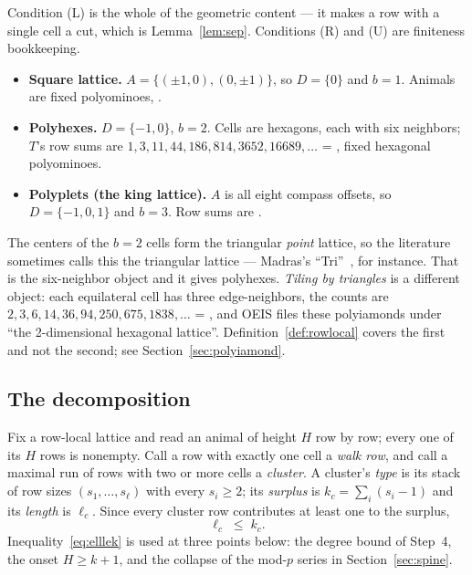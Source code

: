 \documentclass[11pt]{article}
\begin{document}
Condition (L) is the whole of the geometric content --- it makes a row with a
single cell a cut, which is Lemma~\ref{lem:sep}. Conditions (R) and (U) are finiteness bookkeeping.

\begin{example}
\label{ex:instances}
\leavevmode
\begin{itemize}
\item \textbf{Square lattice.} $A = \{(\pm1,0),(0,\pm1)\}$, so $D = \{0\}$ and
  $b=1$. Animals are fixed polyominoes, .
\item \textbf{Polyhexes.} $D = \{-1,0\}$, $b=2$. Cells are hexagons, each with
  six neighbors; $T$'s row sums are $1, 3, 11, 44, 186, 814, 3652, 16689,
  \dots$ = , fixed hexagonal polyominoes.
\item \textbf{Polyplets (the king lattice).} $A$ is all eight compass offsets, so
  $D = \{-1,0,1\}$ and $b=3$. Row sums are .
\end{itemize}
\end{example}

\begin{remark}
\label{rem:names}
The centers of the $b=2$ cells form the triangular \emph{point} lattice, so the
literature sometimes calls this the triangular lattice --- Madras's
``Tri''~\cite{madras1999}, for instance. That is the six-neighbor object and it
gives polyhexes. \emph{Tiling by triangles} is a different object: each
equilateral cell has three edge-neighbors, the counts are
$2, 3, 6, 14, 36, 94, 250, 675, 1838, \dots$ = , and OEIS files
these polyiamonds under ``the 2-dimensional hexagonal lattice''.
Definition~\ref{def:rowlocal} covers the first and not the second; see
Section~\ref{sec:polyiamond}.
\end{remark}

\subsection{The decomposition}

Fix a row-local lattice and read an animal of height $H$ row by row; every one of
its $H$ rows is nonempty. Call a row with exactly one cell a \emph{walk row}, and
call a maximal run of rows with two or more cells a \emph{cluster}. A cluster's
\emph{type} is its stack of row sizes $(s_1,\dots,s_\ell)$ with every
$s_i \ge 2$; its \emph{surplus} is $k_c = \sum_i (s_i - 1)$ and its \emph{length}
is $\ell_c$. Since every cluster row contributes at least one to the surplus,
\begin{equation}
  \ell_c \;\le\; k_c .
  \label{eq:elllek}
\end{equation}
Inequality~\eqref{eq:elllek} is used at three points below: the degree bound of
Step~4, the onset $H \ge k+1$, and the collapse of the mod-$p$ series in
Section~\ref{sec:spine}.
\end{document}
